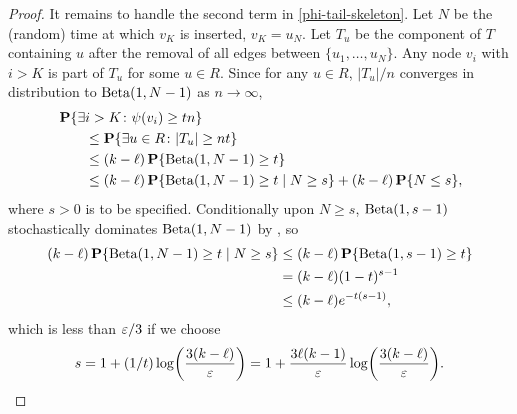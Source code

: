 \begin{proof}
  It remains to handle the second term in
  \eqref{phi-tail-skeleton}. Let $N$ be the (random) time at which
  $v_{K}$ is inserted, \ie $v_{K} = u_N$. Let $T_u$ be the component
  of $T$ containing $u$ after the removal of all edges between
  $\{u_1, \dots, u_N\}$. Any node $v_i$ with $i > K$ is part of $T_u$
  for some $u \in R$. Since for any $u \in R$, $|T_u|/n$ converges in
  distribution to $\operatorname{Beta}(1, N - 1)$ as $n \to \infty$,
  \begin{align}
    &\Pr\{\exists i > K \colon \psi(v_i) \ge tn\} \notag \\
    &\qquad \le \Pr\{\exists u \in R \colon |T_u| \ge n t\} \notag \\
                                                  &\qquad \le (k - \ell) \Pr\{ \Beta(1, N - 1) \ge t \} \notag \\
                                                  &\qquad \le (k - \ell) \Pr\{\Beta(1, N - 1) \ge t \mid N \ge s\} + (k - \ell)\Pr\{N \le s\} , \eqlabel{skeleton-2}
  \end{align}
  where $s > 0$ is to be specified. Conditionally upon $N \ge s$,
  $\operatorname{Beta}(1, s - 1)$ stochastically dominates $\operatorname{Beta}(1, N - 1)$ by
  , so
  \begin{align*}
    (k - \ell) \operatorname{\mathbf{P}}\{\operatorname{Beta}(1, N - 1) \ge t \mid N \ge s\} &\le (k - \ell) \operatorname{\mathbf{P}}\{\operatorname{Beta}(1, s - 1) \ge t\} \\
    &= (k - \ell) (1 - t)^{s - 1} \\
    &\le (k - \ell) e^{- t (s - 1)} , 
  \end{align*}
  which is less than $\varepsilon/3$ if we choose
  \[
    s = 1 + (1/t) \log \left(\frac{3 (k - \ell)}{\eps}\right) = 1 + \frac{3 \ell (k -
      1)}{\eps} \log \left(\frac{3 (k - \ell)}{\eps}\right) .
  \]
  

\end{proof}

